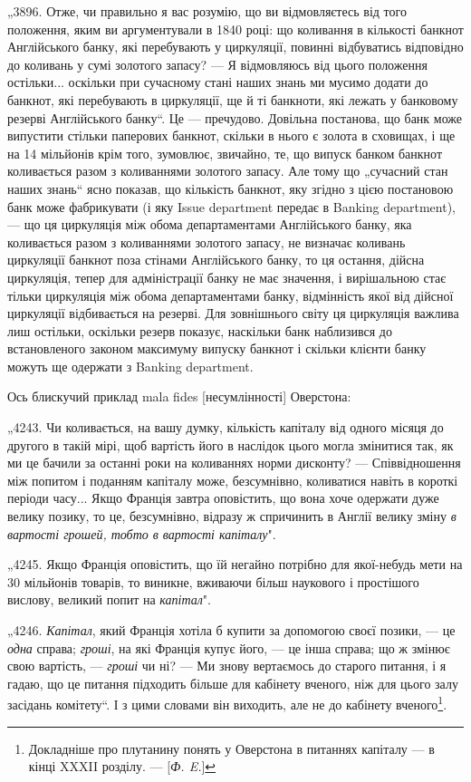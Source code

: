 „3896. Отже, чи правильно я вас розумію, що ви відмовляєтесь
від того положення, яким ви аргументували в 1840 році: що коливання в кількості банкнот Англійського
банку, які перебувають
у циркуляції, повинні відбуватись відповідно до коливань у сумі
золотого запасу? — Я відмовляюсь від цього положення остільки...
оскільки при сучасному стані наших знань ми мусимо додати до
банкнот, які перебувають в циркуляції, ще й ті банкноти, які
лежать у банковому резерві Англійського банку“. Це — пречудово. Довільна постанова, що банк може
випустити стільки
паперових банкнот, скільки в нього є золота в сховищах, і ще на
14 мільйонів крім того, зумовлює, звичайно, те, що випуск банком
банкнот коливається разом з коливаннями золотого запасу. Але
тому що „сучасний стан наших знань“ ясно показав, що кількість
банкнот, яку згідно з цією постановою банк може фабрикувати (і яку
Issue department передає в Banking department), — що ця циркуляція
між обома департаментами Англійського банку, яка коливається
разом з коливаннями золотого запасу, не визначає коливань
циркуляції банкнот поза стінами Англійського банку, то ця
остання, дійсна циркуляція, тепер для адміністрації банку не має
значення, і вирішальною стає тільки циркуляція між обома
департаментами банку, відмінність якої від дійсної циркуляції
відбивається на резерві. Для зовнішнього світу ця циркуляція
важлива лиш остільки, оскільки резерв показує, наскільки банк
наблизився до встановленого законом максимуму випуску банкнот і
скільки клієнти банку можуть ще одержати з Banking department.

Ось блискучий приклад mala fides [несумлінності] Оверстона:

„4243. Чи коливається, на вашу думку, кількість капіталу від
одного місяця до другого в такій мірі, щоб вартість його в наслідок цього могла змінитися так, як ми
це бачили за
останні роки на коливаннях норми дисконту? — Співвідношення
між попитом і поданням капіталу може, безсумнівно, коливатися навіть в короткі періоди часу... Якщо
Франція завтра оповістить, що вона хоче одержати дуже велику позику, то це, безсумнівно, відразу ж
спричинить в Англії велику зміну \emph{в вартості грошей, тобто в вартості капіталу}".

„4245. Якщо Франція оповістить, що їй негайно потрібно для
якої-небудь мети на 30 мільйонів товарів, то виникне, вживаючи
більш наукового і простішого вислову, великий попит на \emph{капітал}".

„4246. \emph{Капітал}, який Франція хотіла б купити за допомогою
своєї позики, — це \emph{одна} справа; \emph{гроші}, на які Франція купує його, — це інша справа; що ж змінює свою
вартість, — \emph{гроші} чи ні? — Ми знову вертаємось до старого питання, і я гадаю, що це питання
підходить більше для кабінету вченого, ніж для цього залу засідань комітету“. І з цими словами він
виходить, але не
до кабінету вченого\footnote{
Докладніше про плутанину понять у Оверстона в питаннях капіталу — в кінці XXXII розділу. — [\emph{Ф.
E.}]
}.
